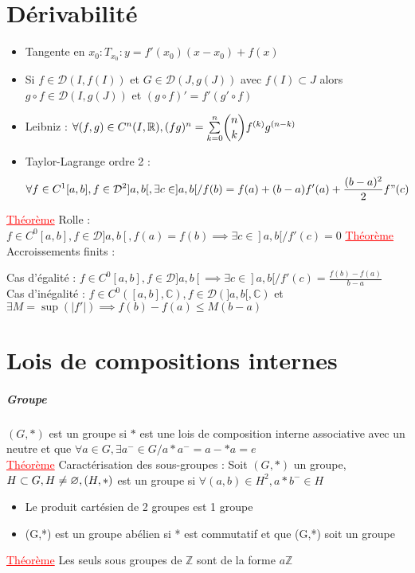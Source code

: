\documentclass[a4paper, french]{article}
\newcommand{\R}{\mathbb{R}}
\newcommand{\C}{\mathbb{C}}
\newcommand{\Z}{\mathbb{Z}}
\newcommand{\D}{\mathcal{D}}
\newcommand{\som}[2]{\overset{#2}{\underset{#1}{\sum}}}
\newcommand{\thm}{\textcolor{red}{\underline{Théorème} }}
\begin{document}
	\section{Dérivabilité}
	\begin{itemize}
	  \item Tangente en $x_0 : T_{x_0} : y=f'(x_0)(x-x_0)+f(x)$
	  \item Si $f \in \D(I,f(I))$ et $ G \in \D(J,g(J))$ avec $f(I) \subset J$ alors $g\circ f \in \D(I,g(J))$ et $(g\circ f)'=f'(g'\circ f)$
	  \item Leibniz : $\forall (f,g) \in C^n(I,\R), (fg)^n=\som{k=0}{n} \dbinom{n}{k} f^{(k)}g^{(n-k)}$
	  \item Taylor-Lagrange ordre 2 : $$\forall f \in C^1[a,b], f \in \D^2]a,b[, \exists c \in ]a,b[ / f(b)=f(a)+(b-a)f'(a)+\frac{(b-a)^2}{2}f"(c)$$
	\end{itemize}
	 \thm Rolle : $f\in C^0[a,b], f \in \D]a,b[, f(a)=f(b) \implies \exists c \in ]a,b[ / f'(c)=0$
	 \thm Accroissements finits : 
		\begin{center}
			Cas d'égalité : $f\in C^0[a,b], f \in \D]a,b[ \implies \exists c \in ]a,b[ / f'(c)=\frac{f(b)-f(a)}{b-a}$ \\
			Cas d'inégalité : $f\in C^0([a,b],\C), f \in \D(]a,b[,\C)$ et $\exists M=\sup(|f'|) \implies f(b)-f(a)\leqslant M(b-a)$
		\end{center}

	\section{Lois de compositions internes}
	\subparagraph{Groupe}
	$(G,*)$ est un groupe si $*$ est une lois de composition interne associative avec un neutre et que $\forall a \in G, \exists a^- \in G / a*a^-=a-*a=e$ \\
	\thm Caractérisation des sous-groupes : Soit $(G,*)$ un groupe, $H \subset G, H \neq \varnothing, \\ (H,*)$ est un groupe si $\forall (a,b) \in H^2, a*b^- \in H$
	\begin{itemize}
	  \item Le produit cartésien de 2 groupes est 1 groupe
	  \item (G,*) est un groupe abélien si * est commutatif et que (G,*) soit un groupe
	\end{itemize}
	 \thm Les seuls sous groupes de $\Z$ sont de la forme $a\Z$
\end{document}
